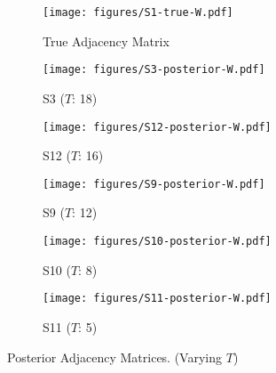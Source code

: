 \begin{figure}[t]
	\centering
	\begin{subfigure}{0.31\textwidth}
		\centering
		\texttt{[image: figures/S1-true-W.pdf]}
		\caption{True Adjacency Matrix}
	\end{subfigure}
	\begin{subfigure}{0.31\textwidth}
		\centering
		\texttt{[image: figures/S3-posterior-W.pdf]}
		\caption{S3 ($T$: 18)}
	\end{subfigure}
	\begin{subfigure}{0.31\textwidth}
		\centering
		\texttt{[image: figures/S12-posterior-W.pdf]}
		\caption{S12 ($T$: 16)}
	\end{subfigure}
	\begin{subfigure}{0.31\textwidth}
		\centering
		\texttt{[image: figures/S9-posterior-W.pdf]}
		\caption{S9 ($T$: 12)}
	\end{subfigure}
	\begin{subfigure}{0.31\textwidth}
		\centering
		\texttt{[image: figures/S10-posterior-W.pdf]}
		\caption{S10 ($T$: 8)}
	\end{subfigure}
	\begin{subfigure}{0.31\textwidth}
		\centering
		\texttt{[image: figures/S11-posterior-W.pdf]}
		\caption{S11 ($T$: 5)}
	\end{subfigure}
	\caption{Posterior Adjacency Matrices. (Varying $T$)}
	\label{fig:S-posterior-1}
\end{figure}
